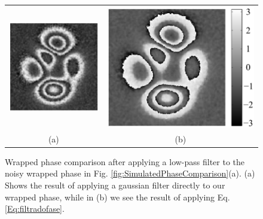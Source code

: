 \begin{figure}[Ht!]
  \begin{center}
    \begin{tabular}{c c }
      \includegraphics[scale=0.63]{Chpt4_figures/Fig_eFaseFiltradaMal.eps}&
      \includegraphics[scale=0.45]{Chpt4_figures/Fig_eFaseFiltrada.eps}\\
      (a) & (b)
    \end{tabular}
  \end{center}
  \caption{ Wrapped phase comparison after applying a low-pass filter to the
  noisy wrapped phase in Fig. \ref{fig:SimulatedPhaseComparison}(a). (a) 
  Shows the result of applying a gaussian filter directly to our wrapped phase,
  while in (b) we see the result of applying Eq. \ref{Eq:filtradofase}.}
  \label{fig:filtradofase}
\end{figure}

